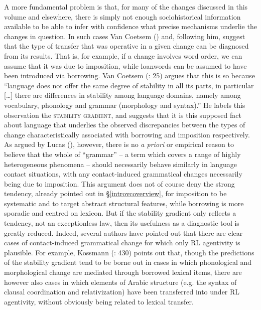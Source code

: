 \documentclass[output=paper]{langsci/langscibook}
\begin{document}
A more fundamental problem is that, for many of the changes discussed in this volume and elsewhere, there is simply not enough sociohistorical information available to be able to infer with confidence what precise mechanisms underlie the changes in question. In such cases Van Coetsem (\citeyear{VanCoetsem1988,VanCoetsem2000}) and, following him, \citet{Winford2005} suggest that the type of transfer that was operative in a given change can be diagnosed from its results. That is, for example, if a change involves word order, we can assume that it was due to imposition, while loanwords can be assumed to have been introduced via borrowing. Van Coetsem (\citeyear{VanCoetsem1988}: 25) argues that this is so because “language does not offer the same
degree of stability in all its parts, in particular […] there are differences in stability
among language domains, namely among vocabulary, phonology and grammar
(morphology and syntax).” He labels this observation the \textsc{stability gradient}, and suggests that it is this supposed fact about language that underlies the observed discrepancies between the types of change characteristically associated with borrowing and imposition respectively. As argued by Lucas (\citeyear{Lucas2012,Lucas2015}), however, there is no \textit{a priori} or empirical reason to believe that the whole of ``grammar'' -- a term which covers a range of highly heterogeneous phenomena -- should necessarily behave similarly in language contact situations, with any contact-induced grammatical changes necessarily being due to imposition. This argument does not of course deny the strong tendency, already pointed out in §\ref{introvcoverview}, for imposition to be systematic and to target abstract structural features, while borrowing is more sporadic and centred on lexicon. But if the stability gradient only reflects a tendency, not an exceptionless law, then its usefulness as a diagnostic tool is greatly reduced. Indeed, several authors have pointed out that there are clear cases of contact-induced grammatical change for which only RL agentivity is plausible. For example, Kossmann (\citeyear{Kossmann2013book}: 430) points out that, though the predictions of the stability gradient tend to be borne out in cases in which phonological and morphological change are mediated through borrowed lexical items, there are however also cases in which elements of Arabic structure (e.g. the syntax of clausal coordination and relativization) have been transferred into  under RL agentivity, without obviously being related to lexical transfer.
\end{document}
